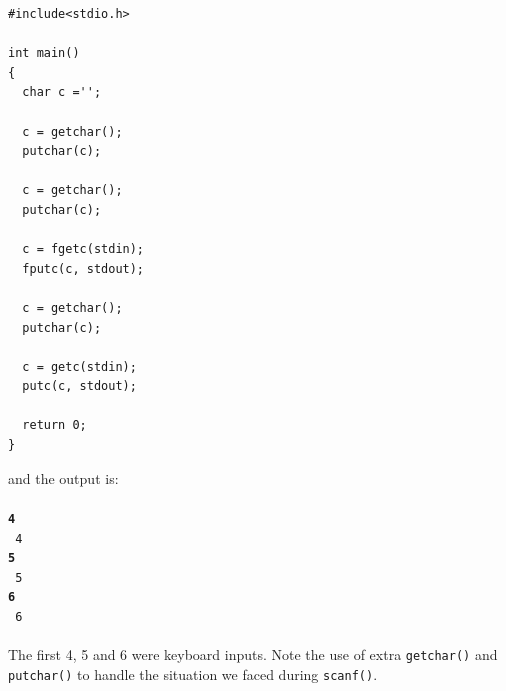 \begin{Verbatim}[frame=single]
#include<stdio.h>

int main()
{
  char c ='';

  c = getchar();
  putchar(c);

  c = getchar();
  putchar(c);

  c = fgetc(stdin);
  fputc(c, stdout);

  c = getchar();
  putchar(c);

  c = getc(stdin);
  putc(c, stdout);

  return 0;
}
\end{Verbatim}

and the output is:
\\\\\texttt{\textbf{4\\}
4\\
\textbf{5\\}
5\\
\textbf{6\\}
6\\\\}
The first 4, 5 and 6 were keyboard inputs. Note the use of extra
\texttt{getchar()} and \texttt{putchar()} to handle the situation we faced
during \texttt{scanf()}.


